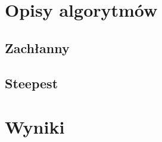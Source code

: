\documentclass[11pt]{article}
\begin{document}
\section{Opisy algorytmów}\label{sec:opisy-alg}


\subsection{Zachłanny}\label{subsec:zachanny}

\subsection{Steepest}\label{subsec:steepest}


\section{Wyniki}\label{sec:wyniki}
\end{document}
